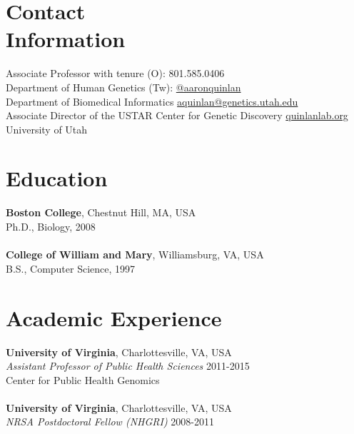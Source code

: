 \documentclass[margin,line]{cv}
\begin{document}
\begin{resume}
    \section{\mysidestyle Contact\\Information}
    Associate Professor with tenure                                                 \hfill (O): 801.585.0406\\%
    Department of Human Genetics                                                    \hfill (Tw): \url{@aaronquinlan}\\%
    Department of Biomedical Informatics                                     \hfill \url{aquinlan@genetics.utah.edu}\\%
    Associate Director of the USTAR Center for Genetic Discovery                      \hfill    \url{quinlanlab.org}\\%
    University of Utah                                                                                       \hfill \\%

    \section{\mysidestyle Education}

    \textbf{Boston College}, Chestnut Hill, MA, USA\\
    Ph.D., Biology, 2008\\
    \\
    \textbf{College of William and Mary}, Williamsburg, VA, USA\\
    B.S., Computer Science, 1997


    \section{\mysidestyle Academic Experience}

    \textbf{University of Virginia}, Charlottesville, VA, USA\\
    \textit{Assistant Professor of Public Health Sciences}                              \hfill 2011-2015\\
    Center for Public Health Genomics\\
    \\
    \textbf{University of Virginia}, Charlottesville, VA, USA\\
    \textit{NRSA Postdoctoral Fellow (NHGRI)}                                          \hfill 2008-2011\\



\end{resume}
\end{document}
